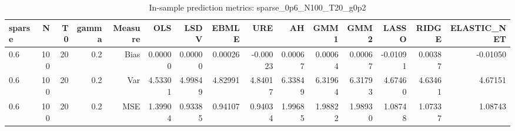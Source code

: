 \begin{table}[!htbp]\centering
\caption{In-sample prediction metrics: sparse_0p6_N100_T20_g0p2}
\label{tab:table2_sparse_0p6_N100_T20_g0p2}
\begin{tabular}{lrrrrrrrrrrrrrr}
\hline
sparse & N & T0 & gamma & Measure & OLS & LSDV & EBMLE & URE & AH & GMM1 & GMM2 & LASSO & RIDGE & ELASTIC_NET \\
\hline
0.6 & 100 & 20 & 0.2 & Bias & 0.00000 & 0.00000 & 0.00026 & -0.00023 & 0.00067 & 0.00064 & 0.00067 & -0.01091 & 0.00387 & -0.01050 \\
0.6 & 100 & 20 & 0.2 & Var & 4.53301 & 4.99849 & 4.82991 & 4.84017 & 6.33849 & 6.31964 & 6.31793 & 4.67460 & 4.63461 & 4.67151 \\
0.6 & 100 & 20 & 0.2 & MSE & 1.39904 & 0.93385 & 0.94107 & 0.94034 & 1.99685 & 1.98822 & 1.98930 & 1.08748 & 1.07337 & 1.08743 \\
\hline
\end{tabular}
\end{table}

